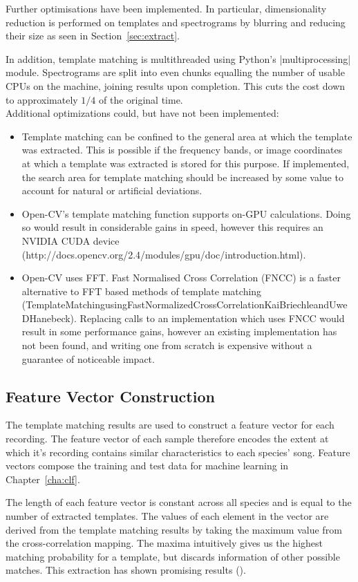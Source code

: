 Further optimisations have been implemented.
In particular, dimensionality reduction is performed on templates and
spectrograms by blurring and reducing their size as seen in
Section~\ref{sec:extract}.

In addition, template matching is multithreaded using Python's |multiprocessing|
module.
Spectrograms are split into even chunks equalling the number of usable CPUs on
the machine, joining results upon completion.
This cuts the cost down to approximately $1/4$ of the original time.\\

Additional optimizations could, but have not been implemented:
\begin{itemize}[noitemsep]
  \item Template matching can be confined to the general area at which the template
    was extracted.
    This is possible if the frequency bands, or image coordinates at which a
    template was extracted is stored for this purpose.
    If implemented, the search area for template matching should be increased by some
    value to account for natural or artificial deviations.

  \item Open-CV's template matching function supports on-GPU calculations.
    Doing so would result in considerable gains in speed, however this requires
    an NVIDIA CUDA device (http://docs.opencv.org/2.4/modules/gpu/doc/introduction.html).

  \item Open-CV uses FFT.
    Fast Normalised Cross Correlation (FNCC) is a faster alternative to FFT based
    methods of template matching (TemplateMatchingusingFastNormalizedCrossCorrelationKaiBriechleandUweDHanebeck).
    Replacing calls to an implementation which uses FNCC would result in some 
    performance gains, however an existing implementation has not been found,
    and writing one from scratch is expensive without a guarantee of noticeable
    impact.
\end{itemize}

\subsection{Feature Vector Construction}
The template matching results are used to construct a feature vector for each
recording.
The feature vector of each sample therefore encodes the extent at which it's
recording contains similar characteristics to each species' song.
Feature vectors compose the training and test data for machine learning in
Chapter~\ref{cha:clf}.

The length of each feature vector is constant across all species and is equal to
the number of extracted templates.
The values of each element in the vector are derived from the template matching
results by taking the maximum value from the cross-correlation mapping.
The maxima intuitively gives us the highest matching probability for a template,
but discards information of other possible matches.
This extraction has shown promising results (\textcite{fodor2013}).

